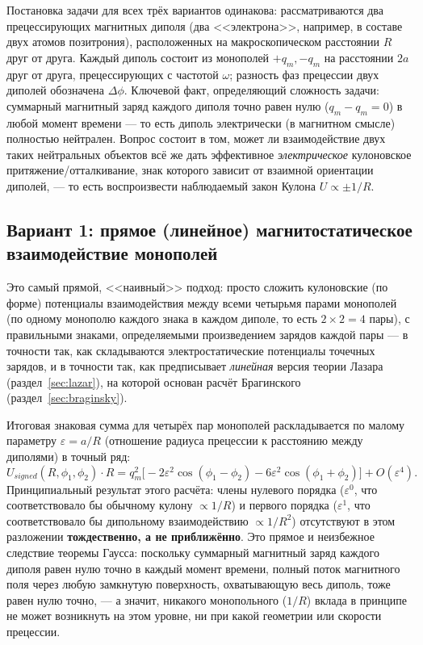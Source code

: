\documentclass[12pt,a4paper]{article}
\begin{document}
Постановка задачи для всех трёх вариантов одинакова: рассматриваются
два прецессирующих магнитных диполя (два <<электрона>>, например, в
составе двух атомов позитрония), расположенных на макроскопическом
расстоянии $R$ друг от друга. Каждый диполь состоит из монополей
$+q_m,-q_m$ на расстоянии $2a$ друг от друга, прецессирующих с
частотой $\omega$; разность фаз прецессии двух диполей обозначена
$\Delta\phi$. Ключевой факт, определяющий сложность задачи: суммарный
магнитный заряд каждого диполя точно равен нулю ($q_m-q_m=0$) в любой
момент времени --- то есть диполь электрически (в магнитном смысле)
полностью нейтрален. Вопрос состоит в том, может ли взаимодействие
двух таких нейтральных объектов всё же дать эффективное
\emph{электрическое} кулоновское притяжение/отталкивание, знак
которого зависит от взаимной ориентации диполей, --- то есть
воспроизвести наблюдаемый закон Кулона $U\propto \pm1/R$.

\subsection{Вариант 1: прямое (линейное) магнитостатическое взаимодействие монополей}

Это самый прямой, <<наивный>> подход: просто сложить кулоновские
(по форме) потенциалы взаимодействия между всеми четырьмя парами
монополей (по одному монополю каждого знака в каждом диполе, то есть
$2\times2=4$ пары), с правильными знаками, определяемыми произведением
зарядов каждой пары --- в точности так, как складываются
электростатические потенциалы точечных зарядов, и в точности так, как
предписывает \emph{линейная} версия теории Лазара
(раздел~\ref{sec:lazar}), на которой основан расчёт Брагинского
(раздел~\ref{sec:braginsky}).

Итоговая знаковая сумма для четырёх пар монополей раскладывается по
малому параметру $\varepsilon=a/R$ (отношение радиуса прецессии к
расстоянию между диполями) в точный ряд:
\begin{equation}
U_{signed}(R,\phi_1,\phi_2)\cdot R = q_m^2\Big[-2\varepsilon^2\cos(\phi_1-\phi_2)
-6\varepsilon^2\cos(\phi_1+\phi_2)\Big] + O(\varepsilon^4).
\end{equation}
Принципиальный результат этого расчёта: члены нулевого порядка
($\varepsilon^0$, что соответствовало бы обычному кулону $\propto1/R$)
и первого порядка ($\varepsilon^1$, что соответствовало бы дипольному
взаимодействию $\propto1/R^2$) отсутствуют в этом разложении
\textbf{тождественно, а не приближённо}. Это прямое и неизбежное
следствие теоремы Гаусса: поскольку суммарный магнитный заряд каждого
диполя равен нулю точно в каждый момент времени, полный поток
магнитного поля через любую замкнутую поверхность, охватывающую весь
диполь, тоже равен нулю точно, --- а значит, никакого монопольного
($1/R$) вклада в принципе не может возникнуть на этом уровне, ни при
какой геометрии или скорости прецессии.
\end{document}
